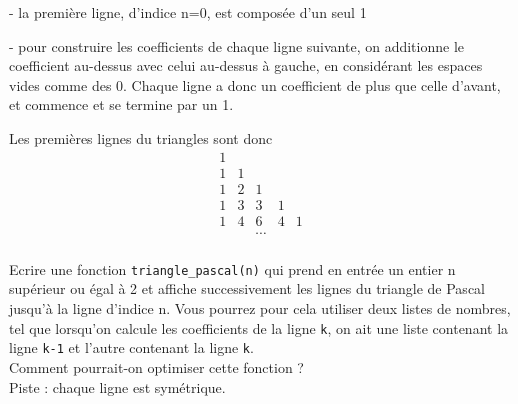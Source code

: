 - la première ligne, d'indice n=0, est composée d'un seul 1


- pour construire les coefficients de chaque ligne suivante, on additionne le coefficient au-dessus avec celui au-dessus à gauche, en considérant les espaces vides comme des 0. Chaque ligne a donc un coefficient de plus que celle d'avant, et commence et se termine par un 1.

Les premières lignes du triangles sont donc \[
    \begin{matrix}
        1                      \\
        1 & 1                  \\
        1 & 2 & 1              \\
        1 & 3 & 3      & 1     \\
        1 & 4 & 6      & 4 & 1 \\
          &   & \cdots         \\
    \end{matrix}
\]

Ecrire une fonction \texttt{triangle\_pascal(n)} qui prend en entrée un entier n supérieur ou égal à 2 et affiche successivement les lignes du triangle de Pascal jusqu'à la ligne d'indice n. Vous pourrez pour cela utiliser deux listes de nombres, tel que lorsqu'on calcule les coefficients de la ligne \texttt{k}, on ait une liste contenant la ligne \texttt{k-1} et l'autre contenant la ligne \texttt{k}. \\


 Comment pourrait-on optimiser cette fonction ? \\
Piste : chaque ligne est symétrique.\\




